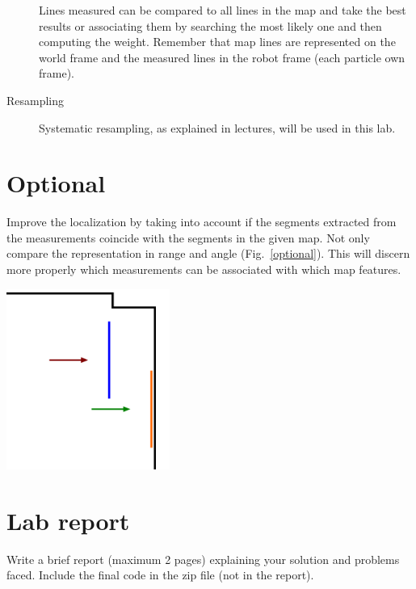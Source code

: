 \documentclass[a4paper,10pt]{article}
\begin{document}
\begin{description}
    Lines measured can be compared to all lines in the map and take the best results or associating them by searching the most likely one and then computing the weight. Remember that map lines are represented on the world frame and the measured lines in the robot frame (each particle own frame).
    
    \item[Resampling] Systematic resampling, as explained in lectures, will be used in this lab.
\end{description}

\section{Optional}

Improve the localization by taking into account if the segments extracted from the measurements coincide with the segments in the given map. Not only compare the representation in range and angle (Fig.~\ref{optional}). This will discern more properly which measurements can be associated with which map features.

\begin{center}
	\includegraphics[width=0.40\textwidth]{pict/lab3-optional}
	\label{optional}
\end{center}

\section{Lab report}

Write a brief report (maximum 2 pages) explaining your solution and problems faced. Include the final code in the zip file (not in the report).
\end{document}
